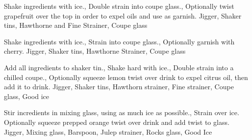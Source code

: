 \documentclass[../main.tex]{subfiles}
\begin{document}

    {
            {Shake ingredients with ice.},
            {Double strain into coupe glass.},
            {Optionally twist grapefruit over the top in order to expel oils and use as garnish.}
    }
    {Jigger, Shaker tins, Hawthorne and Fine Strainer, Coupe glass}

    \cocktailDivider

    {
            {Shake ingredients with ice.},
            {Strain into coupe glass.},
            {Optionally garnish with cherry.}
    }
    {Jigger, Shaker tins, Hawthorne Strainer, Coupe glass}

    \cocktailDivider

    {
            {Add all ingredients to shaker tin.},
            {Shake hard with ice.},
            {Double strain into a chilled coupe.},
            {Optionally squeeze lemon twist over drink to expel citrus oil, then add it to drink.}
    }
    {Jigger, Shaker tins, Hawthorn strainer, Fine strainer, Coupe glass, Good ice}

    \cocktailDivider

    {
            {Stir incredients in mixing glass, using as much ice as possible.},
            {Strain over ice. Optionally squeeze prepped orange twist over drink and add twist to glass.}
    }
    {Jigger, Mixing glass, Barspoon, Julep strainer, Rocks glass, Good Ice}%

    \clearpage
\end{document}
